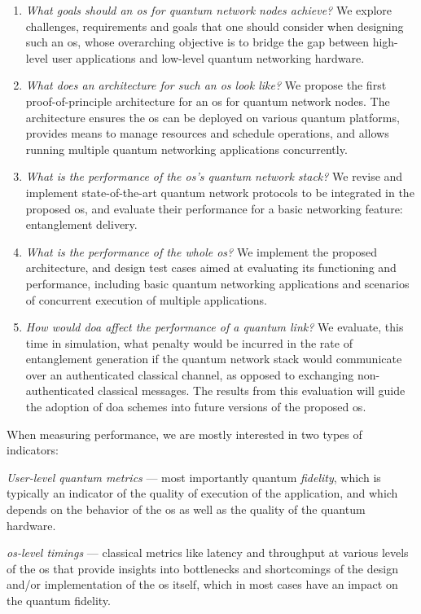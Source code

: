 \begin{enumerate}[label={Q\arabic*.}]
    \item \emph{What goals should an \acrshort{os} for quantum network nodes achieve?} We explore
          challenges, requirements and goals that one should consider when designing such an
          \acrshort{os}, whose overarching objective is to bridge the gap between high-level user
          applications and low-level quantum networking hardware.
    \item \emph{What does an architecture for such an \acrshort{os} look like?} We propose the first
          proof-of-principle architecture for an \acrshort{os} for quantum network nodes. The
          architecture ensures the \acrshort{os} can be deployed on various quantum platforms,
          provides means to manage resources and schedule operations, and allows running multiple
          quantum networking applications concurrently.
    \item \emph{What is the performance of the \acrshort{os}'s quantum network stack?} We revise and
          implement state-of-the-art quantum network protocols to be integrated in the proposed
          \acrshort{os}, and evaluate their performance for a basic networking feature: entanglement
          delivery.
    \item \emph{What is the performance of the whole \acrshort{os}?} We implement the proposed
          architecture, and design test cases aimed at evaluating its functioning and performance,
          including basic quantum networking applications and scenarios of concurrent execution of
          multiple applications.
    \item \emph{How would \acrlong{doa} affect the performance of a quantum link?} We evaluate, this
          time in simulation, what penalty would be incurred in the rate of entanglement generation
          if the quantum network stack would communicate over an authenticated classical channel, as
          opposed to exchanging non-authenticated classical messages. The results from this
          evaluation will guide the adoption of \acrlong{doa} schemes into future versions of the
          proposed \acrshort{os}.
\end{enumerate}

When measuring performance, we are mostly interested in two types of indicators:
%
\begin{inlinelist}
    \item \emph{User-level quantum metrics} --- most importantly quantum \emph{fidelity}, which is
          typically an indicator of the quality of execution of the application, and which depends
          on the behavior of the \acrshort{os} as well as the quality of the quantum hardware.
    \item \emph{\acrshort{os}-level timings} --- classical metrics like latency and throughput at
          various levels of the \acrshort{os} that provide insights into bottlenecks and
          shortcomings of the design and/or implementation of the \acrshort{os} itself, which in
          most cases have an impact on the quantum fidelity.
\end{inlinelist}

